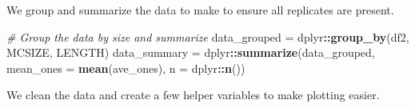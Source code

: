 \documentclass[]{book}
\newenvironment{Shaded}{\begin{snugshade}}{\end{snugshade}}
\newcommand{\CommentTok}[1]{\textcolor[rgb]{0.56,0.35,0.01}{\textit{#1}}}
\newcommand{\DataTypeTok}[1]{\textcolor[rgb]{0.13,0.29,0.53}{#1}}
\newcommand{\KeywordTok}[1]{\textcolor[rgb]{0.13,0.29,0.53}{\textbf{#1}}}
\newcommand{\NormalTok}[1]{#1}
\newcommand{\OperatorTok}[1]{\textcolor[rgb]{0.81,0.36,0.00}{\textbf{#1}}}
\newcommand{\StringTok}[1]{\textcolor[rgb]{0.31,0.60,0.02}{#1}}
\begin{document}
We group and summarize the data to make to ensure all replicates are present.

\begin{Shaded}
\begin{Highlighting}[]
\CommentTok{# Group the data by size and summarize}
\NormalTok{data_grouped =}\StringTok{ }\NormalTok{dplyr}\OperatorTok{::}\KeywordTok{group_by}\NormalTok{(df2, MCSIZE, LENGTH)}
\NormalTok{data_summary =}\StringTok{ }\NormalTok{dplyr}\OperatorTok{::}\KeywordTok{summarize}\NormalTok{(data_grouped, }\DataTypeTok{mean_ones =} \KeywordTok{mean}\NormalTok{(ave_ones), }\DataTypeTok{n =}\NormalTok{ dplyr}\OperatorTok{::}\KeywordTok{n}\NormalTok{())}
\end{Highlighting}
\end{Shaded}

We clean the data and create a few helper variables to make plotting easier.
\end{document}
